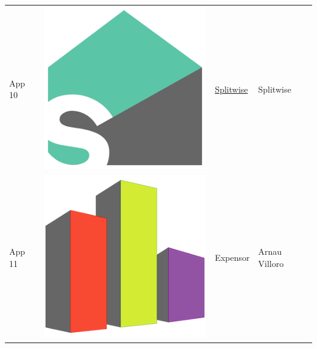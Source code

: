 \begin{tabular}{ | l | c | l | l | }
App 10 & \includegraphics[scale=0.05]{A11_icon.png} & \href{https://play.google.com/store/apps/details?id=com.Splitwise.SplitwiseMobile}{Splitwise} & Splitwise \\

App 11 & \includegraphics[scale=0.2]{A12_icon.png} & Expensor & Arnau Villoro \\
\hline
\end{tabular}